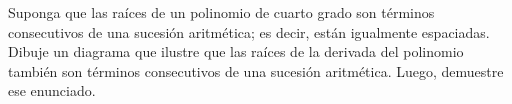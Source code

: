 \item Suponga que las raíces de un polinomio de cuarto grado son términos consecutivos de una sucesión aritmética; es decir, están igualmente espaciadas. Dibuje un diagrama que ilustre que las raíces de la derivada del polinomio también son términos consecutivos de una sucesión aritmética. Luego, demuestre ese enunciado.
